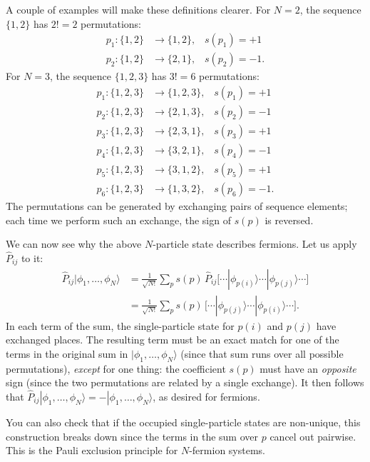 \documentclass[pra,11pt]{revtex4}
\begin{document}
A couple of examples will make these definitions clearer.  For $N=2$,
the sequence $\{1,2\}$ has $2! = 2$ permutations:
$$\begin{aligned}p_1 : \{1,2\} &\rightarrow \{1,2\}, \;\;\;s(p_1) = +1 \\ p_2 : \{1,2\} &\rightarrow \{2,1\}, \;\;\;s(p_2) = -1.\end{aligned}$$
For $N=3$, the sequence $\{1,2,3\}$ has $3!=6$ permutations:
$$\begin{aligned}
  p_1 : \{1,2,3\} &\rightarrow \{1,2,3\}, \;\;\;s(p_1) = +1 \\
  p_2 : \{1,2,3\} &\rightarrow \{2,1,3\}, \;\;\;s(p_2) = -1 \\
  p_3 : \{1,2,3\} &\rightarrow \{2,3,1\}, \;\;\;s(p_3) = +1 \\
  p_4 : \{1,2,3\} &\rightarrow \{3,2,1\}, \;\;\;s(p_4) = -1 \\
  p_5 : \{1,2,3\} &\rightarrow \{3,1,2\}, \;\;\;s(p_5) = +1 \\
  p_6 : \{1,2,3\} &\rightarrow \{1,3,2\}, \;\;\;s(p_6) = -1.\end{aligned}$$
The permutations can be generated by exchanging pairs of sequence
elements; each time we perform such an exchange, the sign of $s(p)$
is reversed.

We can now see why the above $N$-particle state describes fermions.
Let us apply $\hat{P}_{ij}$ to it:
$$\begin{aligned}\hat{P}_{ij}|\phi_1,\dots,\phi_N\rangle &= \frac{1}{\sqrt{N!}} \sum_p s(p)\, \hat{P}_{ij} \big[\cdots |\phi_{p(i)}\rangle \cdots |\phi_{p(j)}\rangle \cdots\big] \\&= \frac{1}{\sqrt{N!}} \sum_p s(p)\, \big[\cdots |\phi_{p(j)}\rangle \cdots |\phi_{p(i)}\rangle \cdots\big].\end{aligned}$$
In each term of the sum, the single-particle state for $p(i)$ and
$p(j)$ have exchanged places.  The resulting term must be an exact
match for one of the terms in the original sum in
$|\phi_1,\dots,\phi_N\rangle$ (since that sum runs over all possible
permutations), \textit{except} for one thing: the coefficient $s(p)$
must have an \textit{opposite} sign (since the two permutations are
related by a single exchange).  It then follows that
$\hat{P}_{ij}|\phi_1,\dots,\phi_N\rangle = -
|\phi_1,\dots,\phi_N\rangle$, as desired for fermions.

You can also check that if the occupied single-particle states are
non-unique, this construction breaks down since the terms in the sum
over $p$ cancel out pairwise.  This is the Pauli exclusion principle
for $N$-fermion systems.
\end{document}
